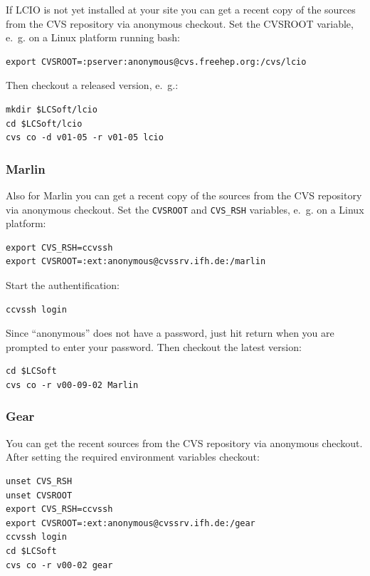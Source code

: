 If LCIO is not yet installed at your site you can get a recent copy
of the sources from the CVS repository via anonymous checkout.
Set the CVSROOT variable, e.~g. on a Linux platform running bash:

\begin{verbatim}
export CVSROOT=:pserver:anonymous@cvs.freehep.org:/cvs/lcio
\end{verbatim}

Then checkout a released version, e.~g.:

\begin{verbatim}
mkdir $LCSoft/lcio 
cd $LCSoft/lcio 
cvs co -d v01-05 -r v01-05 lcio 
\end{verbatim}

\subsubsection*{Marlin}

Also for Marlin you can get a recent copy of the sources from the CVS 
repository via anonymous checkout.
Set the {\tt CVSROOT} and {\tt CVS\_RSH} variables, e.~g. on a Linux platform: 

\begin{verbatim}
export CVS_RSH=ccvssh 
export CVSROOT=:ext:anonymous@cvssrv.ifh.de:/marlin
\end{verbatim}

Start the authentification:

\begin{verbatim}
ccvssh login
\end{verbatim}

Since ``anonymous'' does not have a password, just hit return when you are
prompted to enter your password. Then checkout the latest version:

\begin{verbatim}
cd $LCSoft
cvs co -r v00-09-02 Marlin
\end{verbatim}

\subsubsection*{Gear}

You can get the recent sources from the CVS repository via anonymous checkout.
After setting the required environment variables checkout:

\begin{verbatim}
unset CVS_RSH
unset CVSROOT
export CVS_RSH=ccvssh
export CVSROOT=:ext:anonymous@cvssrv.ifh.de:/gear
ccvssh login
cd $LCSoft
cvs co -r v00-02 gear
\end{verbatim}

